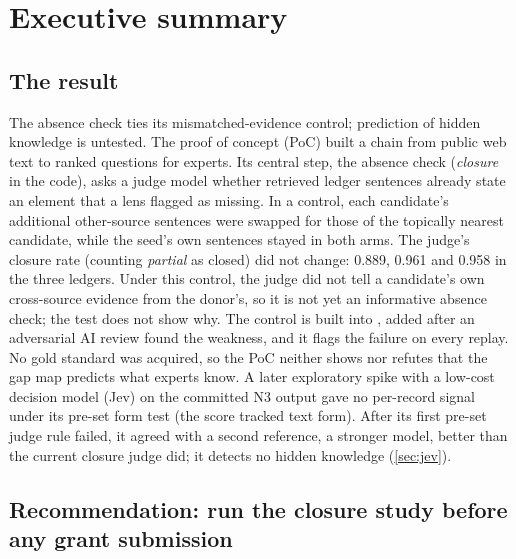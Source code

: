 \section*{Executive summary}\label{sec:summary}

\subsection*{The result}

\evobs{} The absence check ties its mismatched-evidence control; prediction of hidden knowledge is untested. The
proof of concept (PoC) built a chain from public web text to ranked questions for experts. Its
central step, the absence check (\emph{closure} in the code), asks a judge model whether retrieved
ledger sentences already state an element that a lens flagged as missing. In a control, each
candidate's additional other-source sentences were swapped for those of the topically nearest
candidate, while the seed's own sentences stayed in both arms. The judge's closure rate (counting
\emph{partial} as closed) did not change: 0.889, 0.961 and 0.958 in the three ledgers. Under this
control, the judge did not tell a candidate's own cross-source evidence from the donor's, so it is not
yet an informative absence check; the test does not show why. The control is built into , added after an
adversarial AI review found the weakness, and it flags the failure on every replay. No gold standard
was acquired, so the PoC neither shows nor refutes that the gap map predicts what experts know. A later
exploratory spike with a low-cost decision model (Jev) on the committed N3 output gave no per-record signal under its pre-set form test (the score tracked text form). After its first pre-set judge rule failed, it agreed with a second reference, a stronger model, better than the current closure judge did; it detects no hidden knowledge (\cref{sec:jev}).

\subsection*{Recommendation: run the closure study before any grant submission}

